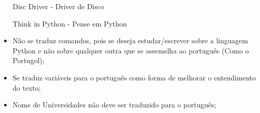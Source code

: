 
\begin{itemize}
    \item [Disc Driver] - Driver de Disco
    \item [Think in Python] - Pense em Python

\end{itemize}


\begin{itemize}
    \item Não se traduz comandos, pois se deseja estudar/escrever sobre a linguagem Python e não sobre qualquer outra que se assemelha ao português (Como o Portugol);
    
    \item Se traduz variáveis para o português como forma de melhorar o entendimento do texto;
    
    \item Nome de Universidades não deve ser traduzido para o português;
    
    
    
    
\end{itemize}